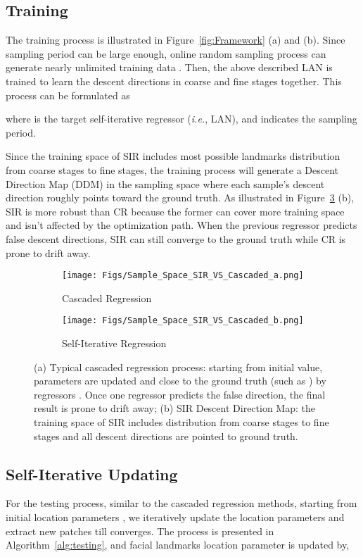 \documentclass[letterpaper]{article} \usepackage{aaai18}  \usepackage{times}  \usepackage{helvet}  \usepackage{courier}  \usepackage{url}  \usepackage{graphicx}
\def\ie{{\em i.e.}}
\begin{document}
\subsection{Training}
The training process is illustrated in Figure~\ref{fig:Framework} (a) and (b). Since sampling period  can be large enough, online random sampling process can generate nearly unlimited training data . Then, the above described LAN is trained to learn the descent directions in coarse and fine stages together. This process can be formulated as

where  is the target self-iterative regressor (\ie, LAN), and  indicates the  sampling period.

Since the training space of SIR includes most possible landmarks distribution from coarse stages to fine stages, the training process will generate a Descent Direction Map (DDM) in the sampling space where each sample's descent direction roughly points toward the ground truth. As illustrated in Figure~\ref{fig:sampling_space} (b), SIR is more robust than CR because the former can cover more training space and isn't affected by the optimization path. When the previous regressor predicts false descent directions, SIR can still converge to the ground truth while CR is prone to drift away.

\begin{figure}[ht]
\begin{subfigure}{.25\textwidth}
  \centering
  \texttt{[image: Figs/Sample\_Space\_SIR\_VS\_Cascaded\_a.png]}
  \caption{Cascaded Regression}
  \label{fig:sample_fig1}
\end{subfigure}\begin{subfigure}{.25\textwidth}
  \centering
  \texttt{[image: Figs/Sample\_Space\_SIR\_VS\_Cascaded\_b.png]}
  \caption{Self-Iterative Regression}
  \label{fig:sample_fig2}
\end{subfigure}
\caption{(a) Typical cascaded regression process: starting from initial value, parameters are updated and close to the ground truth (such as ) by regressors . Once one regressor predicts the false direction, the final result is prone to drift away; (b) SIR Descent Direction Map: the training space of SIR includes distribution from coarse stages to fine stages and all descent directions are pointed to ground truth. }
\label{fig:sampling_space}
\end{figure}


\subsection{Self-Iterative Updating}
For the testing process, similar to the cascaded regression methods, starting from initial location parameters , we iteratively update the location parameters  and extract new patches  till converges. The process is presented in Algorithm~\ref{alg:testing}, and facial landmarks location parameter is updated by, 
\end{document}
